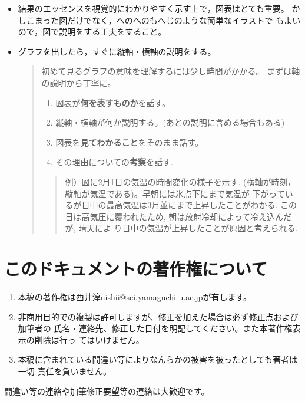 \documentclass[12pt, ]{jsarticle}
\begin{document}
\begin{itemize}
\item
  結果のエッセンスを視覚的にわかりやすく示す上で，図表はとても重要。
  かしこまった図だけでなく，へのへのもへじのような簡単なイラストで
  もよいので，図で説明をする工夫をすること。
\item
  グラフを出したら，すぐに縦軸・横軸の説明をする。

  \begin{quote}
  初めて見るグラフの意味を理解するには少し時間がかかる。
  まずは軸の説明から丁寧に。

  \begin{enumerate}
  \item
    図表が\textbf{何を表すものか}を話す。
  \item
    縦軸・横軸が何か説明する。(あとの説明に含める場合もある)
  \item
    図表を\textbf{見てわかること}をそのまま話す。
  \item
    その理由についての\textbf{考察}を話す.
  \end{enumerate}

  \begin{quote}
  例）図に2月1日の気温の時間変化の様子を示す.
  (横軸が時刻，縦軸が気温である)。早朝には氷点下にまで気温が
  下がっているが日中の最高気温は3月並にまで上昇したことがわかる.
  この日は高気圧に覆われたため, 朝は放射冷却によって冷え込んだが,
  晴天によ り日中の気温が上昇したことが原因と考えられる.
  \end{quote}
  \end{quote}
\end{itemize}

\hypertarget{ux3053ux306eux30c9ux30adux30e5ux30e1ux30f3ux30c8ux306eux8457ux4f5cux6a29ux306bux3064ux3044ux3066}{%
\section{このドキュメントの著作権について}\label{ux3053ux306eux30c9ux30adux30e5ux30e1ux30f3ux30c8ux306eux8457ux4f5cux6a29ux306bux3064ux3044ux3066}}

\begin{enumerate}
\item
  本稿の著作権は西井淳\url{nishii@sci.yamaguchi-u.ac.jp}が有します。
\item
  非商用目的での複製は許可しますが、修正を加えた場合は必ず修正点および加筆者の
  氏名・連絡先、修正した日付を明記してください。また本著作権表示の削除は行っ
  てはいけません。
\item
  本稿に含まれている間違い等によりなんらかの被害を被ったとしても著者は一切
  責任を負いません。
\end{enumerate}

間違い等の連絡や加筆修正要望等の連絡は大歓迎です。
\end{document}
